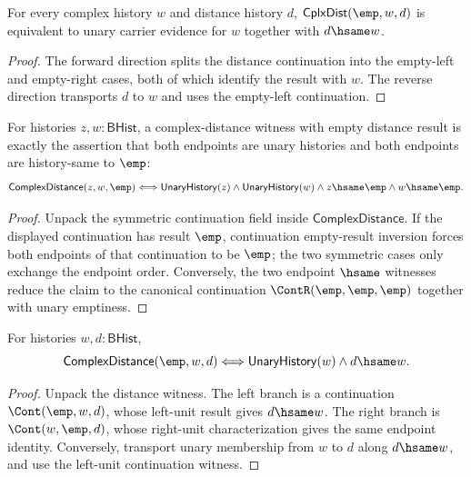 \begin{lemma}
\label{lem:cplx-distance-empty-left-endpoint}
For every complex history \(w\) and distance history \(d\),
\(\mathsf{CplxDist}(\emp,w,d)\) is equivalent to unary carrier evidence for
\(w\) together with \(d\hsame w\).
\end{lemma}
\begin{proof}
The forward direction splits the distance continuation into the empty-left and
empty-right cases, both of which identify the result with \(w\). The reverse
direction transports \(d\) to \(w\) and uses the empty-left continuation.
\end{proof}

\begin{theorem}
\label{thm:cplx-distance-empty-endpoint}
For histories $z,w:\mathsf{BHist}$, a complex-distance witness with empty
distance result is exactly the assertion that both endpoints are unary
histories and both endpoints are history-same to $\emp$:
$$
\mathsf{ComplexDistance}(z,w,\emp)
\Longleftrightarrow
\mathsf{UnaryHistory}(z)\land
\mathsf{UnaryHistory}(w)\land
z\hsame\emp\land
w\hsame\emp.
$$
\end{theorem}
\begin{proof}
Unpack the symmetric continuation field inside $\mathsf{ComplexDistance}$.
If the displayed continuation has result $\emp$, continuation empty-result
inversion forces both endpoints of that continuation to be $\emp$; the two
symmetric cases only exchange the endpoint order. Conversely, the two
endpoint $\hsame$ witnesses reduce the claim to the canonical continuation
$\ContR(\emp,\emp,\emp)$ together with unary emptiness.
\end{proof}

\begin{lemma}
\label{lem:cplx-distance-empty-source-iff}
For histories $w,d:\mathsf{BHist}$,
$$
\mathsf{ComplexDistance}(\emp,w,d)
\Longleftrightarrow
\mathsf{UnaryHistory}(w)\wedge d\hsame w.
$$
\end{lemma}
\begin{proof}
Unpack the distance witness. The left branch is a continuation
$\Cont(\emp,w,d)$, whose left-unit result gives $d\hsame w$. The right
branch is $\Cont(w,\emp,d)$, whose right-unit characterization gives the
same endpoint identity. Conversely, transport unary membership from $w$ to
$d$ along $d\hsame w$, and use the left-unit continuation witness.
\end{proof}

